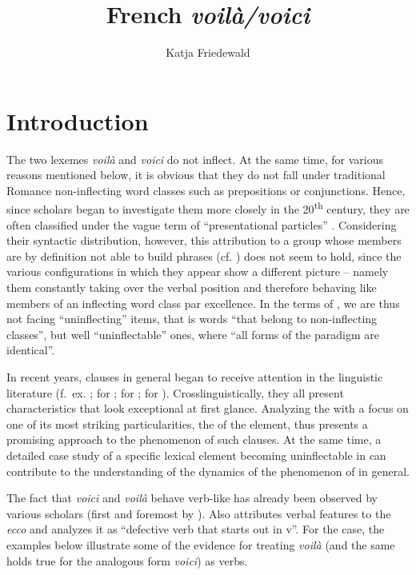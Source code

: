 \documentclass[output=paper,colorlinks,citecolor=brown]{langscibook}
\author{Katja Friedewald\orcid{}\affiliation{University of Göttingen}}
\title{French \textit{voilà/voici}}
\begin{document}
\maketitle

\section{Introduction} \label{07sec1}

The two  lexemes \emph{voilà} and \emph{voici} do not inflect. At the same time, for various reasons mentioned below, it is obvious that they do not fall under traditional Romance non-inflecting word classes such as prepositions or conjunctions. Hence, since scholars began to investigate them more closely in the 20\textsuperscript{th} century, they are often classified under the vague term of ``presentational particles'' \citep[152]{petit2010}. Considering their syntactic distribution, however, this attribution to a group whose members are by definition not able to build phrases (cf. \citealt[509]{busmann2008}) does not seem to hold, since the various configurations in which they appear show a different picture -- namely them constantly taking over the verbal position and therefore behaving like members of an inflecting word class par excellence. In the terms of \citet[142]{spencer2020}, we are thus not facing ``uninflecting'' items, that is words ``that belong to non-inflecting classes'', but well ``uninflectable'' ones, where ``all forms of the paradigm are identical''.

In recent years,  clauses in general began to receive attention in the linguistic literature (f.~ex. \citealt{julia2018}; \citealt{zanuttini2017} for ; \citealt{bonillacarvajal2020} for ; \citealt{woodzanuttini2023} for ). Crosslinguistically, they all present characteristics that look exceptional at first glance. Analyzing the   with a focus on one of its most striking particularities, the  of the  element, thus presents a promising approach to the phenomenon of such clauses. At the same time, a detailed case study of a specific lexical element becoming uninflectable in  can contribute to the understanding of the dynamics of the phenomenon of  in general.

The fact that \emph{voici} and \emph{voilà} behave verb-like has already been observed by various scholars (first and foremost by \citealt{moignet1974, morin1985}). Also \citet[241]{zanuttini2017} attributes verbal features to the  \emph{ecco} and analyzes it as ``defective verb that starts out in v''. For the  case, the examples below illustrate some of the evidence for treating \emph{voilà} (and the same holds true for the analogous form \emph{voici}) as verbs.
\end{document}

